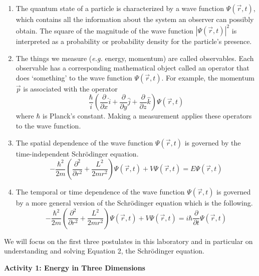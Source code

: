 \begin{enumerate}

\item The quantum state of a particle is characterized by a wave function  
$\Psi(\vec r,t)$, which contains all the information about the system an observer can 
possibly obtain.
The square of the magnitude of the wave function $|\Psi (\vec r,t)|^2$ 
is interpreted as a probability or probability density for the particle's presence. 

\item The things we measure ({\it e.g.} energy, momentum) are called observables. 
Each observable has a corresponding mathematical object called an operator 
that does `something' to the wave function $\Psi(\vec r,t)$.
For example, the momentum $\vec p$ is associated with the operator 
\begin{equation}
\frac{\hbar}{i} \left ( \frac{\partial}{\partial x} \hat i +
    \frac{\partial}{\partial y} \hat j +
    \frac{\partial}{\partial z} \hat k \right ) \Psi(\vec r,t)
\end{equation}
where $\hbar$ is Planck's constant.
Making a measurement applies these operators to the wave function.

\item The spatial dependence of the wave function $\Psi(\vec r,t)$ is governed by
the time-independent Schr\"odinger equation.
\begin{equation}
-\frac{\hbar^2}{2 m}\left ( \frac{\partial^2}{\partial r^2} +  
   \frac{L^2}{2 m r^2} \right ) \Psi(\vec r,t) + V \Psi(\vec r,t) = E  \Psi(\vec r,t)
\end{equation}

\item The temporal or time dependence of the wave function $\Psi(\vec r,t)$ is governed by
a more general version of the Schr\"odinger equation which is the following.
\begin{equation}
-\frac{\hbar^2}{2 m}\left ( \frac{\partial^2}{\partial r^2} +  
   \frac{L^2}{2 m r^2}  \right ) \Psi(\vec r,t) + 
   V \Psi(\vec r,t) = 
   i\hbar \frac{\partial}{\partial t} \Psi(\vec r,t)
\end{equation}

\end{enumerate}

\noindent We will focus on the first three postulates in this laboratory and in particular
on understanding and solving Equation 2, the Schr\"odinger equation.

\textbf{Activity 1: Energy in Three Dimensions}


